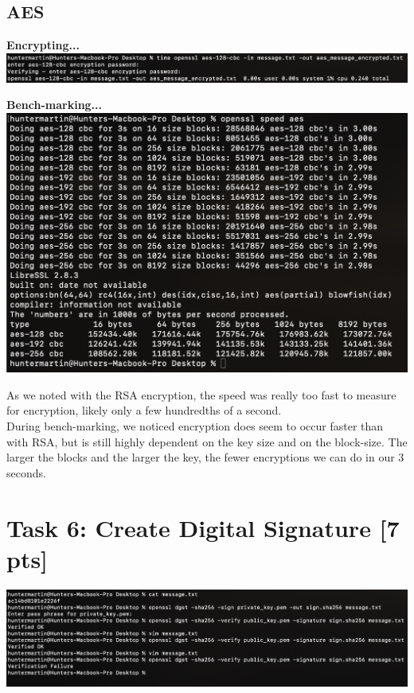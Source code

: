 \documentclass{article}
\begin{document}
\subsection{AES}
\begin{center}
    \textbf{Encrypting...}\\
    \includegraphics[scale=0.4]{aes_in.png}
    
    \textbf{Bench-marking...}\\
    \includegraphics[scale=0.5]{aes_benchmarking.png}
\end{center}
As we noted with the RSA encryption, the speed was really too fast to measure for encryption, likely only a few hundredths of a second.\\

During bench-marking, we noticed encryption does seem to occur faster than with RSA, but is still highly dependent on the key size and on the block-size.  The larger the blocks and the larger the key, the fewer encryptions we can do in our 3 seconds.

\section{Task 6: Create Digital Signature [7 pts]}
\begin{center}
    \includegraphics[scale=0.5]{task6.png}
\end{center}
\end{document}
